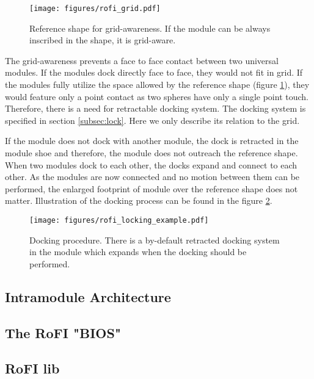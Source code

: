 \begin{figure}
    \centering
    \texttt{[image: figures/rofi\_grid.pdf]}
    \caption{Reference shape for grid-awareness. If the module can be always inscribed in the shape, it is grid-aware.}
    \label{fig:rofi_grid}
\end{figure}

The grid-awareness prevents a face to face contact between two universal
modules. If the modules dock directly face to face, they would not fit in grid.
If the modules fully utilize the space allowed by the reference shape (figure
\ref{fig:rofi_grid}), they would feature only a point contact as two spheres
have only a single point touch. Therefore, there is a need for retractable
docking system. The docking system is specified in section \ref{subsec:lock}.
Here we only describe its relation to the grid.

If the module does not dock with another module, the dock is retracted in the
module shoe and therefore, the module does not outreach the reference shape.
When two modules dock to each other, the docks expand and connect to each other.
As the modules are now connected and no motion between them can be performed,
the enlarged footprint of module over the reference shape does not matter.
Illustration of the docking process can be found in the figure
\ref{fig:rofi_locking_example}.

\begin{figure}
    \centering
    \texttt{[image: figures/rofi\_locking\_example.pdf]}
    \caption{Docking procedure. There is a by-default retracted docking system
    in the module which expands when the docking should be performed.}
    \label{fig:rofi_locking_example}
\end{figure}

\subsection{Intramodule Architecture}

\subsection{The RoFI "BIOS" }

\subsection{RoFI lib}

